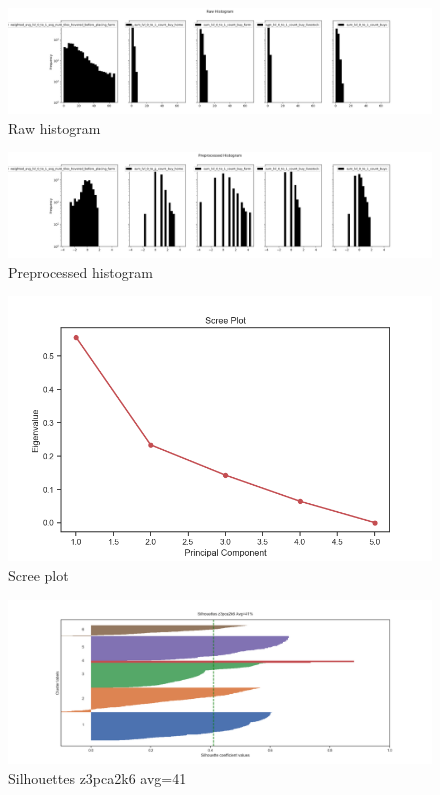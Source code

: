 \documentclass{article}
\begin{document}
\begin{figure}[H]
    \centering
    \includegraphics[width=1\columnwidth]{Lakeland/actions_lvl01_logtransform_z3pca2k6/Raw Histogram.png}
    \caption{Raw histogram}
    \label{fig:Lakelandactionsrawhistogram}
\end{figure}
\begin{figure}[H]
    \centering
    \includegraphics[width=1\columnwidth]{Lakeland/actions_lvl01_logtransform_z3pca2k6/Preprocessed Histogram.png}
    \caption{Preprocessed histogram}
    \label{fig:Lakelandactionspreprocessedhistogram}
\end{figure}
\begin{figure}[H]
    \centering
    \includegraphics[width=1\columnwidth]{Lakeland/actions_lvl01_logtransform_z3pca2k6/Scree Plot.png}
    \caption{Scree plot}
    \label{fig:Lakelandactionsscreeplot}
\end{figure}
\begin{figure}[H]
    \centering
    \includegraphics[width=1\columnwidth]{Lakeland/actions_lvl01_logtransform_z3pca2k6/Silhouettes z3pca2k6 Avg=41.png}
    \caption{Silhouettes z3pca2k6 avg=41}
    \label{fig:Lakelandactionssilhouettesz3pca2k6avg=41}
\end{figure}
\end{document}
